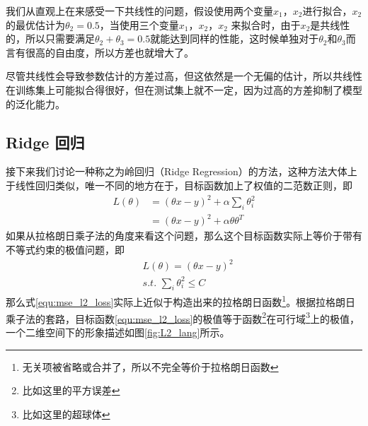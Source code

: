 我们从直观上在来感受一下共线性的问题，假设使用两个变量$x_1$，$x_2$进行拟合，$x_2$的最优估计为$\theta_2 = 0.5$，当使用三个变量$x_1$，$x_2$，$x_2$ 来拟合时，由于$x_2$是共线性的，所以只需要满足$\theta_2 + \theta_3 = 0.5$就能达到同样的性能，这时候单独对于$\theta_2$和$\theta_3$而言有很高的自由度，所以方差也就增大了。

尽管共线性会导致参数估计的方差过高，但这依然是一个无偏的估计，所以共线性在训练集上可能拟合得很好，但在测试集上就不一定，因为过高的方差抑制了模型的泛化能力。




\subsection{Ridge 回归} %
\label{sub:ridge_回归}
接下来我们讨论一种称之为岭回归（Ridge Regression）的方法，这种方法大体上于线性回归类似，唯一不同的地方在于，目标函数加上了权值的二范数正则，即
\begin{equation}\label{equ:mse_l2_loss}
	\begin{split}
		L(\theta) &= (\theta x - y)^2 + \alpha \sum_i\theta_i^2\\
		 &= (\theta x - y)^2 + \alpha \theta\theta^T
	\end{split}
\end{equation}
如果从拉格朗日乘子法的角度来看这个问题，那么这个目标函数实际上等价于带有不等式约束的极值问题，即
\begin{equation}
\begin{split}
	&L(\theta) = (\theta x - y)^2 \\
    &s.t.\text{~} \sum_i\theta_i^2 \leq C
\end{split}
\end{equation}
那么式\ref{equ:mse_l2_loss}实际上近似于构造出来的拉格朗日函数\footnote{无关项被省略或合并了，所以不完全等价于拉格朗日函数}。根据拉格朗日乘子法的套路，目标函数\ref{equ:mse_l2_loss}的极值等于函数\footnote{比如这里的平方误差}在可行域\footnote{比如这里的超球体}上的极值，一个二维空间下的形象描述如图\ref{fig:L2_lang}所示。



